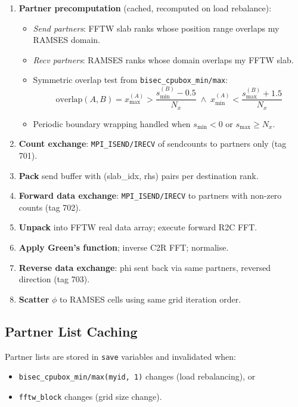 \documentclass[11pt,fleqn]{book}
\begin{document}
\begin{enumerate}[nosep]
  \item \textbf{Partner precomputation} (cached, recomputed on load rebalance):
  \begin{itemize}[nosep]
    \item \textit{Send partners}: FFTW slab ranks whose position range overlaps my RAMSES domain.
    \item \textit{Recv partners}: RAMSES ranks whose domain overlaps my FFTW slab.
    \item Symmetric overlap test from \texttt{bisec\_cpubox\_min/max}:
    \[
      \text{overlap}(A, B) = x_{\max}^{(A)} > \frac{s_{\min}^{(B)} - 0.5}{N_x} \;\wedge\; x_{\min}^{(A)} < \frac{s_{\max}^{(B)} + 1.5}{N_x}
    \]
    \item Periodic boundary wrapping handled when $s_{\min} < 0$ or $s_{\max} \ge N_x$.
  \end{itemize}
  \item \textbf{Count exchange}: \texttt{MPI\_ISEND/IRECV} of sendcounts to partners only (tag 701).
  \item \textbf{Pack} send buffer with (slab\_idx, rhs) pairs per destination rank.
  \item \textbf{Forward data exchange}: \texttt{MPI\_ISEND/IRECV} to partners with non-zero counts (tag 702).
  \item \textbf{Unpack} into FFTW real data array; execute forward R2C FFT.
  \item \textbf{Apply Green's function}; inverse C2R FFT; normalise.
  \item \textbf{Reverse data exchange}: phi sent back via same partners, reversed direction (tag 703).
  \item \textbf{Scatter} $\phi$ to RAMSES cells using same grid iteration order.
\end{enumerate}

\subsection{Partner List Caching}

Partner lists are stored in \texttt{save} variables and invalidated when:
\begin{itemize}[nosep]
  \item \texttt{bisec\_cpubox\_min/max(myid, 1)} changes (load rebalancing), or
  \item \texttt{fftw\_block} changes (grid size change).
\end{itemize}
\end{document}
